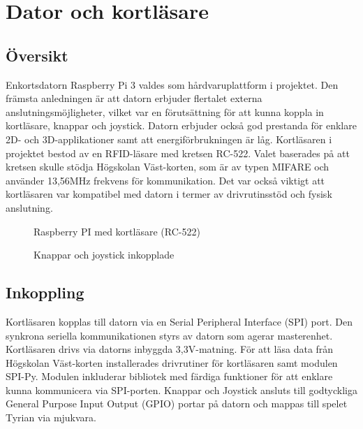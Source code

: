 \documentclass[12pt,fleqn,openany]{book} %
\begin{document}
\section{Dator och kortläsare}
\subsection{Översikt}
Enkortsdatorn Raspberry Pi 3 valdes som hårdvaruplattform i projektet. Den främsta anledningen är att datorn erbjuder flertalet
externa anslutningsmöjligheter, vilket var en förutsättning för att kunna koppla in kortläsare, knappar och joystick. Datorn 
erbjuder också god prestanda för enklare 2D- och 3D-applikationer samt att energiförbrukningen är låg. Kortläsaren i projektet 
bestod av en RFID-läsare med kretsen RC-522. Valet baserades på att kretsen skulle stödja Högskolan Väst-korten, som är av typen 
MIFARE och använder 13,56MHz frekvens för kommunikation. Det var också viktigt att kortläsaren var kompatibel med datorn i termer 
av drivrutinsstöd och fysisk anslutning.

\begin{figure}[!htb]
  \begin{minipage}{0.48\textwidth}
    \centering
    \caption{Raspberry PI med kortläsare (RC-522)}
    \label{fig_pirfid}
  \end{minipage}\hfill
  \begin{minipage}{0.48\textwidth}
    \centering
    \caption{Knappar och joystick inkopplade}
    \label{fig_knappar}
  \end{minipage}\hfill
\end{figure}

\subsection{Inkoppling}
Kortläsaren kopplas till datorn via en Serial Peripheral Interface (SPI) port. Den synkrona seriella kommunikationen styrs av 
datorn som agerar masterenhet. Kortläsaren drivs via datorns inbyggda 3,3V-matning. För att läsa data från Högskolan Väst-korten 
installerades drivrutiner för kortläsaren samt modulen SPI-Py. Modulen inkluderar bibliotek med färdiga funktioner för att enklare 
kunna kommunicera via SPI-porten. Knappar och Joystick ansluts till godtyckliga General Purpose Input Output (GPIO) portar på datorn 
och mappas till spelet Tyrian via mjukvara.
\end{document}
